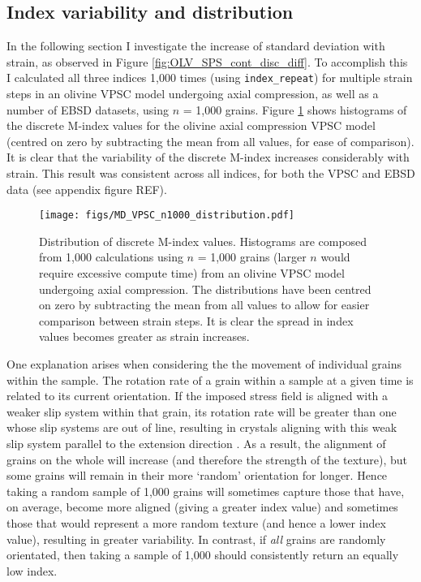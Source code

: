 \documentclass[a4paper,12pt,twoside]{report}
\numberwithin{equation}{chapter}
\begin{document}
\subsection{Index variability and distribution}

In the following section I investigate the increase of standard deviation with strain, as observed in Figure \ref{fig:OLV_SPS_cont_disc_diff}. To accomplish this I calculated all three indices 1,000 times (using \texttt{index\_repeat}) for multiple strain steps in an olivine VPSC model undergoing axial compression, as well as a number of EBSD datasets, using $n$ = 1,000 grains. Figure \ref{fig:VPSC_md_dist} shows histograms of the discrete M-index values for the olivine axial compression VPSC model (centred on zero by subtracting the mean from all values, for ease of comparison). It is clear that the variability of the discrete M-index increases considerably with strain. This result was consistent across all indices, for both the VPSC and EBSD data (see appendix figure REF).

\begin{figure}[h]
  \centering
    \texttt{[image: figs/MD\_VPSC\_n1000\_distribution.pdf]}
  \caption[Discrete M-index distribution (olivine VPSC)]{Distribution of discrete M-index values. Histograms are composed from 1,000 calculations using $n$ = 1,000 grains (larger $n$ would require excessive compute time) from an olivine VPSC model undergoing axial compression. The distributions have been centred on zero by subtracting the mean from all values to allow for easier comparison between strain steps. It is clear the spread in index values becomes greater as strain increases.}
  \label{fig:VPSC_md_dist}
\end{figure} 

One explanation arises when considering the the movement of individual grains within the sample. The rotation rate of a grain within a sample at a given time is related to its current orientation. If the imposed stress field is aligned with a weaker slip system within that grain, its rotation rate will be greater than one whose slip systems are out of line, resulting in crystals aligning with this weak slip system parallel to the extension direction \citep[e.g. post-perovskite,][]{Walker2012}. As a result, the alignment of grains on the whole will increase (and therefore the strength of the texture), but some grains will remain in their more \lq{}random\rq{} orientation for longer. Hence taking a random sample of 1,000 grains will sometimes capture those that have, on average, become more aligned (giving a greater index value) and sometimes those that would represent a more random texture (and hence a lower index value), resulting in greater variability. In contrast, if \emph{all} grains are randomly orientated, then taking a sample of 1,000 should consistently return an equally low index.     
\end{document}
